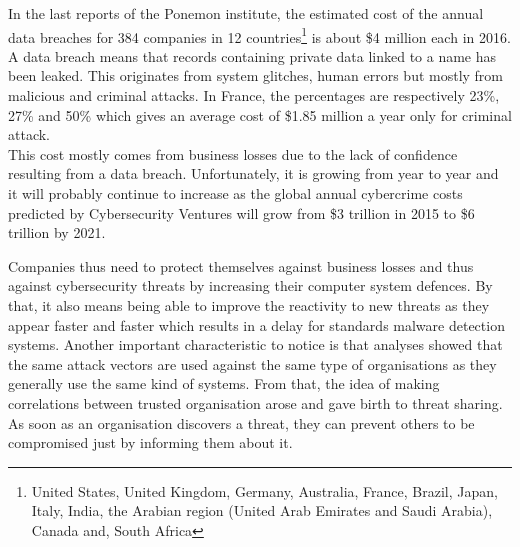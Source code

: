 \documentclass{eplmastersthesis}
\begin{document}
In the last reports of the Ponemon institute\cite{ponemon2016cost, ponemon2016costFr}, the estimated cost of the annual data breaches for 384 companies in 12 countries\footnote{United States, United Kingdom, Germany, Australia, France, Brazil, Japan, Italy, India, the Arabian region (United Arab Emirates and Saudi Arabia), Canada and, South Africa} is about \$4 million each in 2016.\\
A data breach means that records containing private data linked to a name has been leaked. This originates from system glitches, human errors but  mostly from malicious and criminal attacks. In France, the percentages are respectively 23\%, 27\% and 50\% which gives an average cost of \$1.85 million a year only for criminal attack.\\
This cost mostly comes from business losses due to the lack of confidence resulting from a data breach. Unfortunately, it is growing from year to year and it will probably continue to increase as the global annual cybercrime costs predicted by Cybersecurity Ventures will grow from  \$3 trillion in 2015 to \$6 trillion by 2021.

Companies thus need to protect themselves against business losses and thus against cybersecurity threats by increasing their computer system defences. By that, it also means being able to improve the reactivity to new threats as they appear faster and faster which results in a delay for standards malware detection systems. Another important characteristic to notice is that analyses showed that the same attack vectors are used against the same type of organisations as they generally use the same kind of systems. From that, the idea of making correlations between trusted organisation arose and gave birth to threat sharing.  As soon as an organisation discovers a threat, they can prevent others to be compromised just by informing them about it.\\
\end{document}
